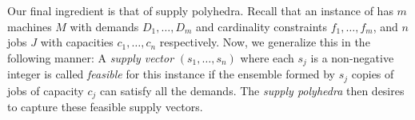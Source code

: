 



\iffalse
 The following claim shows we can remove $\Cd$ from consideration.
\begin{claim}\label{clm:prelim3}
	Let $\Cd$ be a $(\rho,\tau)$-deletable set.
	Given an $(a,b)$-approximate feasible solution $(x',\y)$ where $x'_{ijp}$ is defined only for $j\in C\setminus \Cd$, we can extend $x'$ to a general $(x,\y)$ solution
	which is $(a+\tau, b(1+\rho))$-approximate feasible.
\end{claim}
\begin{proof}
For any $j\in \Cd$, define $x_{ijp} = \sum_{j'\in C\setminus \Cd} x_{ij'p}\phi_{j,j'}$.
We get for all $j\in \Cd$,
$\textstyle \sum_{i\in F} \sum_{p\in [P]} x_{ijp} = \sum_{i,p} \sum_{j'\in C\setminus \Cd} x_{ij'p}\phi_{j,j'} = \sum_{j'\in C\setminus \Cd} \phi_{j,j'} \left(\sum_{i,p} x_{ij'p}\right) \geq \sum_{j'\in C\setminus \Cd} \phi_{j,j'} = 1$,
and for all $i\in F,p\in [P]$,
$\textstyle \sum_{j\in \Cd}  x_{ijp} = \sum_{j\in \Cd} \sum_{j'\in C\setminus \Cd} x_{ij'p}\phi_{j,j'} = \sum_{j'\in C\setminus \Cd} x_{ij'p}\left( \sum_{j\in \Cd} \phi_{j,j'}\right)  \leq \rho \sum_{j'\in C\setminus \Cd} x_{ijp} \leq b\rho c_p$. Therefore, in all we have $\sum_{j\in C} x_{ijp} \leq bc_p(1+\rho)$.
\end{proof}
\fi


Our final ingredient is that of supply polyhedra. Recall that an instance of  \cckp has $m$ machines $M$ with demands $D_1,\ldots,D_m$ and cardinality constraints $f_1,\ldots, f_m$, and $n$  jobs $J$ with capacities $c_1,\ldots,c_n$ respectively. Now, we generalize this in the following manner:
 A {\em supply vector} $(s_1,\ldots,s_n)$ where each $s_j$ is a non-negative integer
is called {\em feasible} for this instance if the ensemble formed by $s_j$ copies of jobs of capacity $c_j$ can satisfy all the demands.
The {\em supply polyhedra} then desires to capture these feasible supply vectors.

